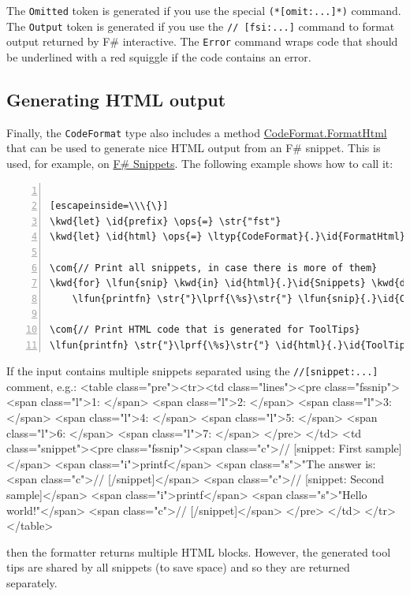 \documentclass{article}
\newcommand{\id}[1]{\textcolor{black}{#1}}
\newcommand{\com}[1]{\textcolor{officegreen}{#1}}
\newcommand{\kwd}[1]{\textcolor{navy}{#1}}
\newcommand{\ops}[1]{\textcolor{purple}{#1}}
\newcommand{\str}[1]{\textcolor{olive}{#1}}
\begin{document}
The \texttt{Omitted} token is generated if you use the special \texttt{(*[omit:...]*)} command.
The \texttt{Output} token is generated if you use the \texttt{// [fsi:...]} command to format
output returned by F\# interactive. The \texttt{Error} command wraps code that should be
underlined with a red squiggle if the code contains an error.
\subsection*{Generating HTML output}



Finally, the \texttt{CodeFormat} type also includes a method \href{https://fsprojects.github.io/FSharp.Formatting/reference/fsharp-formatting-codeformat-codeformat.html\#FormatHtml}{CodeFormat.FormatHtml} that can be used
to generate nice HTML output from an F\# snippet. This is used, for example, on
\href{http://www.fssnip.net}{F\# Snippets}. The following example shows how to call it:
\begin{lstlisting}[numbers=left]

[escapeinside=\\\{\}]
\kwd{let} \id{prefix} \ops{=} \str{"fst"}
\kwd{let} \id{html} \ops{=} \ltyp{CodeFormat}{.}\id{FormatHtml}{(}\id{snippets}{,} \id{prefix}{)}

\com{// Print all snippets, in case there is more of them}
\kwd{for} \lfun{snip} \kwd{in} \id{html}{.}\id{Snippets} \kwd{do}
    \lfun{printfn} \str{"}\lprf{\%s}\str{"} \lfun{snip}{.}\id{Content}

\com{// Print HTML code that is generated for ToolTips}
\lfun{printfn} \str{"}\lprf{\%s}\str{"} \id{html}{.}\id{ToolTip}

\end{lstlisting}



If the input contains multiple snippets separated using the \texttt{//[snippet:...]} comment, e.g.:
<table class="pre"><tr><td class="lines"><pre class="fssnip">
<span class="l">1: </span>
<span class="l">2: </span>
<span class="l">3: </span>
<span class="l">4: </span>
<span class="l">5: </span>
<span class="l">6: </span>
<span class="l">7: </span>
</pre>
</td>
<td class="snippet"><pre class="fssnip"><span class="c">// [snippet: First sample]</span>
<span class="i">printf</span> <span class="s">"The answer is: %
<span class="c">// [/snippet]</span>
<span class="c">// [snippet: Second sample]</span>
<span class="i">printf</span> <span class="s">"Hello world!"</span>
<span class="c">// [/snippet]</span>
</pre>
</td>
</tr>
</table>


then the formatter returns multiple HTML blocks. However, the generated tool tips
are shared by all snippets (to save space) and so they are returned separately.
\end{document}

